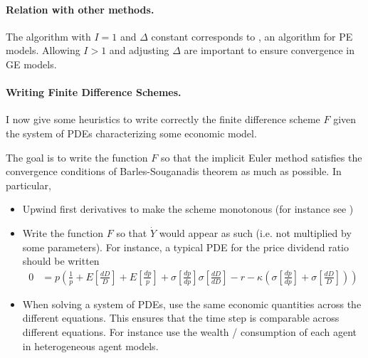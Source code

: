 \documentclass[english]{article}
\begin{document}
	\paragraph{Relation with other methods.} The algorithm with $I=1$ and $\Delta$ constant corresponds to \citet{achdou2014heterogeneous}, an algorithm for PE models. Allowing $I > 1$ and adjusting $\Delta$  are important to ensure convergence in GE models.

	\paragraph{Writing Finite Difference Schemes.}
	I now give some heuristics to write correctly the finite difference scheme $F$ given the system of PDEs characterizing some economic model.\par
	The goal is to write the function $F$ so that the implicit Euler method satisfies the convergence conditions of Barles-Souganadis theorem as much as possible. In particular,
	\begin{itemize}
		\item Upwind first derivatives to make the scheme monotonous (for instance see \citet{achdou2014heterogeneous})
		\item Write the function $F$ so that $\dot{Y}$ would appear as such (i.e. not multiplied by some parameters). For instance, a typical PDE for the price dividend ratio should be written
		\begin{align*}
			0 &= p (\frac{1}{p} + E[\frac{dD}{D}] + E[\frac{dp}{p}] + \sigma[\frac{dp}{dp}]\sigma[\frac{dD}{dD}] - r - \kappa(\sigma[\frac{dp}{dp}] + \sigma[\frac{dD}{D}]))
		\end{align*}
		\item  When solving a system of PDEs, use the same economic quantities across the different equations. This ensures that the time step is comparable across different equations. For instance use the wealth / consumption of each agent in heterogeneous agent models.
	\end{itemize}
	
	
\end{document}

